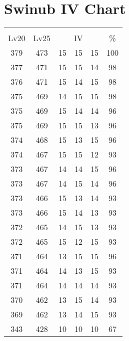 \documentclass{article}%
\begin{document}
%
\normalsize%
\section{Swinub IV Chart}%
\label{sec:Swinub IV Chart}%
\renewcommand{\arraystretch}{1.5}%
\begin{tabular}{|c|c|c|c|c|c|}%
\hline%
\multicolumn{6}{|c|}{\textcolor{white}{ 
\linebreak{Swinub}
}%
\cellcolor{black}}\\%
\multicolumn{1}{|c}{Lv20}&\multicolumn{1}{c|}{Lv25}&\multicolumn{3}{c|}{IV}&\multicolumn{1}{|c|}{\%}\\%
\hline%
\rowcolor{color100}%
379&473&15&15&15&100\\%
\hline%
\rowcolor{color98}%
377&471&15&15&14&98\\%
\hline%
\rowcolor{color98}%
376&471&15&14&15&98\\%
\hline%
\rowcolor{color98}%
375&469&14&15&15&98\\%
\hline%
\rowcolor{color96}%
375&469&15&14&14&96\\%
\hline%
\rowcolor{color96}%
375&469&15&15&13&96\\%
\hline%
\rowcolor{color96}%
374&468&15&13&15&96\\%
\hline%
\rowcolor{color93}%
374&467&15&15&12&93\\%
\hline%
\rowcolor{color96}%
373&467&14&14&15&96\\%
\hline%
\rowcolor{color96}%
373&467&14&15&14&96\\%
\hline%
\rowcolor{color93}%
373&466&15&13&14&93\\%
\hline%
\rowcolor{color93}%
373&466&15&14&13&93\\%
\hline%
\rowcolor{color93}%
372&465&14&15&13&93\\%
\hline%
\rowcolor{color93}%
372&465&15&12&15&93\\%
\hline%
\rowcolor{color96}%
371&464&13&15&15&96\\%
\hline%
\rowcolor{color93}%
371&464&14&13&15&93\\%
\hline%
\rowcolor{color93}%
371&464&14&14&14&93\\%
\hline%
\rowcolor{color93}%
370&462&13&15&14&93\\%
\hline%
\rowcolor{color93}%
369&462&13&14&15&93\\%
\hline%
\rowcolor{color91}%
343&428&10&10&10&67\\%
\end{tabular}

%
\end{document}
